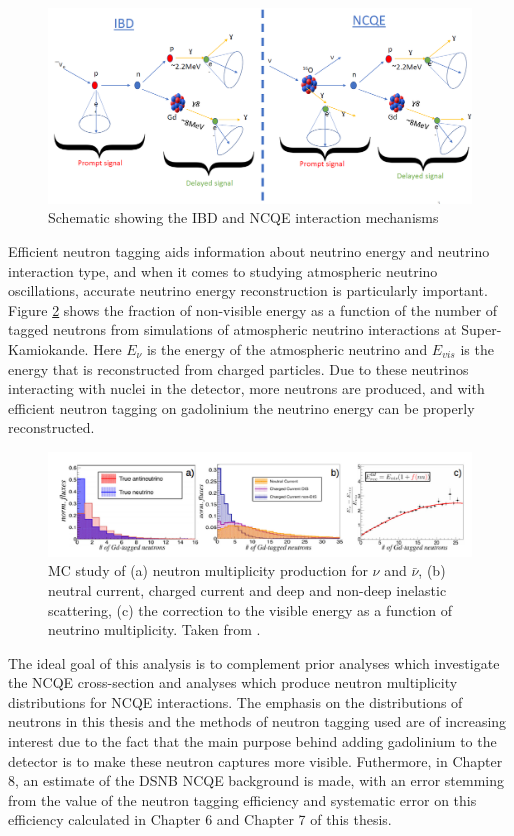 \begin{figure}
    \centering
    \includegraphics[width=\textwidth]{Figures/schematic.png}
\caption{Schematic showing the IBD and NCQE interaction mechanisms}
\label{fig:NCQE_IBD}
\end{figure}


Efficient neutron tagging aids information about neutrino energy and neutrino interaction type, and when it comes to studying atmospheric neutrino oscillations, accurate neutrino energy reconstruction is particularly important. Figure \ref{fig:atm_nu_energy} shows the fraction of non-visible energy as a function of the number of tagged neutrons from simulations of atmospheric neutrino interactions at Super-Kamiokande. Here $E_{\nu}$ is the energy of the atmospheric neutrino and $E_{vis}$ is the energy that is reconstructed from charged particles. Due to these neutrinos interacting with nuclei in the detector, more neutrons are produced, and with efficient neutron tagging on gadolinium the neutrino energy can be properly reconstructed. 

\begin{figure}
\centering
\includegraphics[width=1.1\textwidth]{Figures/atm_recon_energy.png}
\caption{MC study of (a) neutron multiplicity production for $\nu$ and ${\bar{\nu}}$, (b) neutral current, charged current and deep and non-deep inelastic scattering, (c) the correction to the visible energy as a function of neutrino multiplicity. Taken from \cite{marti_evaluation_2020}.}
\label{fig:atm_nu_energy}
\end{figure}



The ideal goal of this analysis is to complement prior analyses which investigate the NCQE cross-section and analyses which produce neutron multiplicity distributions for NCQE interactions. The emphasis on the distributions of neutrons in this thesis and the methods of neutron tagging used are of increasing interest due to the fact that the main purpose behind adding gadolinium to the detector is to make these neutron captures more visible. Futhermore, in Chapter 8, an estimate of the DSNB NCQE background is made, with an error stemming from the value of the neutron tagging efficiency and systematic error on this efficiency calculated in Chapter 6 and Chapter 7 of this thesis.


